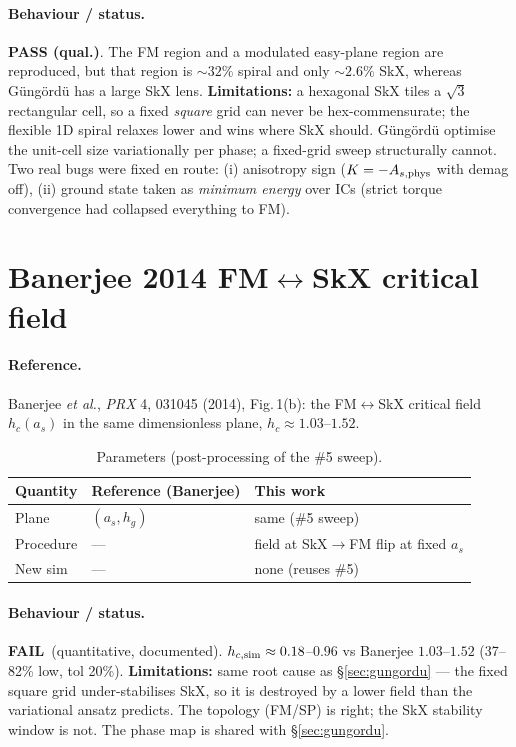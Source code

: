 \documentclass[11pt]{article}
\newcommand{\FAIL}{\textcolor{red!75!black}{\textbf{FAIL}}}
\newcommand{\QUAL}{\textcolor{orange!85!black}{\textbf{PASS (qual.)}}}
\begin{document}
\paragraph{Behaviour / status.} \QUAL. The FM region and a
modulated easy-plane region are reproduced, but that region is
${\sim}32\%$ spiral and only ${\sim}2.6\%$ SkX, whereas
G\"ung\"ord\"u has a large SkX lens.
\textbf{Limitations:} a hexagonal SkX tiles a $\sqrt3$ rectangular
cell, so a fixed \emph{square} grid can never be hex-commensurate;
the flexible 1D spiral relaxes lower and wins where SkX should.
G\"ung\"ord\"u optimise the unit-cell size variationally per phase;
a fixed-grid sweep structurally cannot. Two real bugs were fixed en
route: (i) anisotropy sign ($K=-A_{s,\rm phys}$ with demag off),
(ii) ground state taken as \emph{minimum energy} over ICs (strict
torque convergence had collapsed everything to FM).

\clearpage
\section{Banerjee 2014 FM$\leftrightarrow$SkX critical field}
\label{sec:banerjee}

\paragraph{Reference.} Banerjee \emph{et al.}, \emph{PRX} 4,
031045 (2014), Fig.\,1(b): the FM$\leftrightarrow$SkX critical
field $h_c(a_s)$ in the same dimensionless plane,
$h_c\approx1.03$--$1.52$.

\begin{table}[htbp]
\centering
\caption{Parameters (post-processing of the \#5 sweep).}
\begin{tabular}{@{}lll@{}}
\toprule
Quantity & Reference (Banerjee) & This work \\
\midrule
Plane     & $(a_s,h_g)$        & same (\#5 sweep) \\
Procedure & --- & field at SkX$\to$FM flip at fixed $a_s$ \\
New sim   & --- & none (reuses \#5) \\
\bottomrule
\end{tabular}
\end{table}

\paragraph{Behaviour / status.} \FAIL\ (quantitative, documented).
$h_{c,\rm sim}\approx0.18$--$0.96$ vs Banerjee $1.03$--$1.52$
(37--82\% low, tol 20\%). \textbf{Limitations:} same root cause as
\S\ref{sec:gungordu} --- the fixed square grid under-stabilises SkX,
so it is destroyed by a lower field than the variational ansatz
predicts. The topology (FM/SP) is right; the SkX stability window
is not. The phase map is shared with \S\ref{sec:gungordu}.
\end{document}
